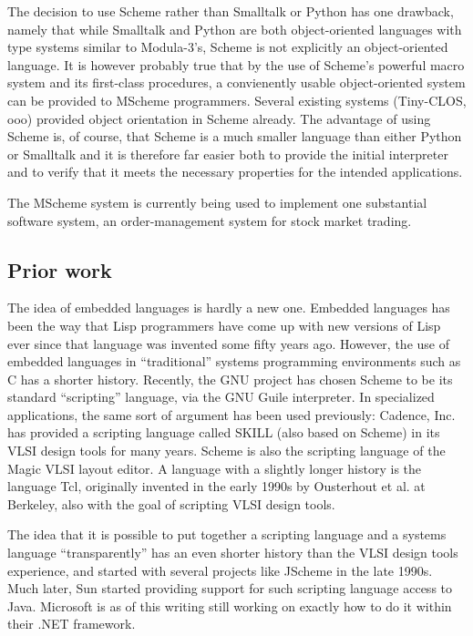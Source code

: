 The decision to use Scheme rather than Smalltalk or Python has one
drawback, namely that while Smalltalk and Python are both
object-oriented languages with type systems similar to Modula-3's,
Scheme is not explicitly an object-oriented language.  It is however
probably true that by the use of Scheme's powerful macro system and
its first-class procedures, a convienently usable object-oriented
system can be provided to MScheme programmers.  Several existing
systems (Tiny-CLOS, ooo) provided object orientation in Scheme
already.  The advantage of using Scheme is, of course, that Scheme is
a much smaller language than either Python or Smalltalk and it is
therefore far easier both to provide the initial interpreter and to
verify that it meets the necessary properties for the intended
applications.

The MScheme system is currently being used to implement one 
substantial software system, an order-management system for stock market
trading.

\subsection{Prior work}

The idea of embedded languages is hardly a new one.  Embedded
languages has been the way that Lisp programmers have come up with new
versions of Lisp ever since that language was invented some fifty
years ago.  However, the use of embedded languages in ``traditional''
systems programming environments such as C has a shorter history.
Recently, the GNU project has chosen Scheme to be its standard
``scripting'' language, via the GNU Guile interpreter.  In specialized
applications, the same sort of argument has been used previously:
Cadence, Inc. has provided a scripting language called SKILL (also
based on Scheme) in its VLSI design tools for many years.  Scheme is
also the scripting language of the Magic VLSI layout editor.  A
language with a slightly longer history is the language Tcl,
originally invented in the early 1990s by Ousterhout et al. at
Berkeley, also with the goal of scripting VLSI design tools.

The idea that it is possible to put together a scripting language and
a systems language ``transparently'' has an even shorter history than
the VLSI design tools experience, and started with several projects
like JScheme in the late 1990s.  Much later, Sun started providing
support for such scripting language access to Java.  Microsoft is as
of this writing still working on exactly how to do it within their
.NET framework.

